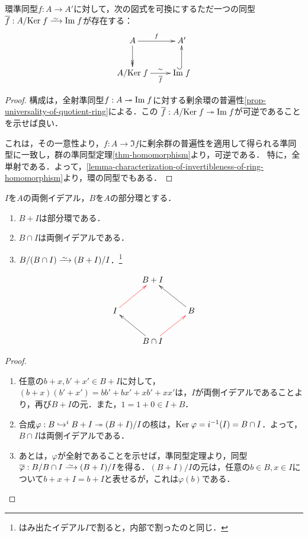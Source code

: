 \documentclass[uplatex,dvipdfmx]{jsreport}
\begin{document}
\begin{theorem}[準同型定理]\label{thm-ring-homomorphism-decomposition}
    環準同型$f:A\to A'$に対して，次の図式を可換にするただ一つの同型$\o{f}:A/\Ker f\iso\Im f$が存在する：
    \[\xymatrix{
        A\ar[r]^-f\ar@{->>}[d]&A'\\
        A/\Ker f\ar[r]^-{\sim}_-{\o{f}}&\Im f\ar@{^{(}->}[u]
    }\]
\end{theorem}
\begin{proof}
    構成は，全射準同型$f:A\twoheadrightarrow\mathrm{Im}\; f$に対する剰余環の普遍性\ref{prop-universality-of-quotient-ring}による．この
    $\overline{f}:A/\mathrm{Ker}\; f\twoheadrightarrow\mathrm{Im}\; f$が可逆であることを示せば良い．

    これは，その一意性より，$f:A\to\Im f$に剰余群の普遍性を適用して得られる準同型に一致し，群の準同型定理\ref{thm-homomorphism}より，可逆である．
    特に，全単射である．よって，\ref{lemma-characterization-of-invertibleness-of-ring-homomorphism}より，環の同型でもある．
\end{proof}

\begin{corollary}[第二同型定理]
    $I$を$A$の両側イデアル，$B$を$A$の部分環とする．
    \begin{enumerate}
        \item $B+I$は部分環である．
        \item $B\cap I$は両側イデアルである．
        \item $B/(B\cap I)\iso(B+I)/I$．\footnote{はみ出たイデアル$I$で割ると，内部で割ったのと同じ．}
    \end{enumerate}
    \[\xymatrix{
        &B+I\\
        I\ar@[red][ur]&&B\ar[ul]\\
        &B\cap I\ar[ul]\ar@[red][ur]
    }\]
\end{corollary}
\begin{proof}\mbox{}
    \begin{enumerate}
        \item 任意の$b+x,b'+x'\in B+I$に対して，$(b+x)(b'+x')=bb'+bx'+xb'+xx'$は，$I$が両側イデアルであることより，再び$B+I$の元．また，$1=1+0\in I+B$．
        \item 合成$\varphi:B\hookrightarrow^iB+I\twoheadrightarrow(B+I)/I$の核は，$\mathrm{Ker}\;\varphi=i^{-1}(I)=B\cap I$．よって，$B\cap I$は両側イデアルである．
        \item あとは，$\varphi$が全射であることを示せば，準同型定理より，同型$\o{\varphi}:B/B\cap I\iso(B+I)/I$を得る．$(B+I)/I$の元は，任意の$b\in B,x\in I$について$b+x+I=b+I$と表せるが，これは$\varphi(b)$である．
    \end{enumerate}
\end{proof}
\end{document}

